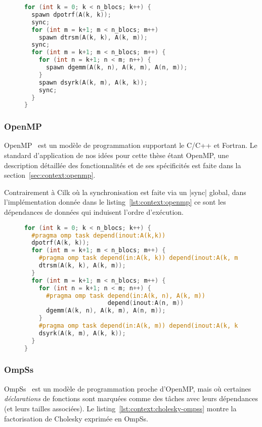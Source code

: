 \begin{figure}[h!]
\begin{lstlisting}[language=c++,caption=Cholesky exprimé en Cilk,label=lst:context:cilk]
for (int k = 0; k < n_blocs; k++) {
  spawn dpotrf(A(k, k));
  sync;
  for (int m = k+1; m < n_blocs; m++)
    spawn dtrsm(A(k, k), A(k, m));
  sync;
  for (int m = k+1; m < n_blocs; m++) {
    for (int n = k+1; n < m; n++) {
      spawn dgemm(A(k, n), A(k, m), A(n, m));
    }
    spawn dsyrk(A(k, m), A(k, k));
    sync;
  }
}
\end{lstlisting}
\end{figure}


\subsubsection{OpenMP}

OpenMP~\cite{openmp45} est un modèle de programmation supportant le C/C++ et Fortran.
Le standard d'application de nos idées pour cette thèse étant OpenMP, une description détaillée des fonctionnalités et de ses spécificités est faite dans la section~\ref{sec:context:openmp}.

Contrairement à Cilk où la synchronisation est faite via un |sync| global, dans l'implémentation donnée dans le listing~\ref{lst:context:openmp} ce sont les dépendances de données qui induisent l'ordre d'exécution.

\begin{figure}[h!]
\begin{lstlisting}[language=c++,caption=Cholesky exprimé en OpenMP,label=lst:context:openmp]
for (int k = 0; k < n_blocs; k++) {
  #pragma omp task depend(inout:A(k,k))
  dpotrf(A(k, k));
  for (int m = k+1; m < n_blocs; m++) {
    #pragma omp task depend(in:A(k, k)) depend(inout:A(k, m))
    dtrsm(A(k, k), A(k, m));
  }
  for (int m = k+1; m < n_blocs; m++) {
    for (int n = k+1; n < m; n++) {
      #pragma omp task depend(in:A(k, n), A(k, m))
                       depend(inout:A(n, m))
      dgemm(A(k, n), A(k, m), A(n, m));
    }
    #pragma omp task depend(in:A(k, m)) depend(inout:A(k, k))
    dsyrk(A(k, m), A(k, k));
  }
}
\end{lstlisting}
\end{figure}

\subsubsection{OmpSs}

OmpSs~\cite{OMPSs} est un modèle de programmation proche d'OpenMP, mais où certaines \emph{déclarations} de fonctions sont marquées comme des tâches avec leurs dépendances (et leurs tailles associées).
Le listing~\ref{lst:context:cholesky-ompss} montre la factorisation de Cholesky exprimée en OmpSs.

